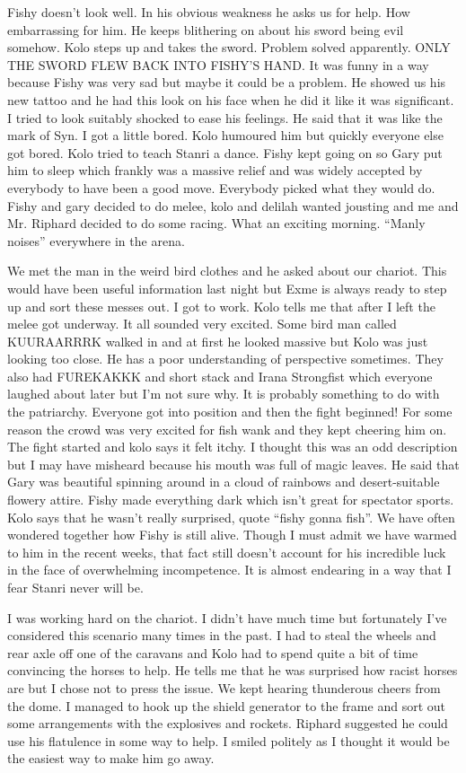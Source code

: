 Fishy doesn’t look well. In his obvious weakness he asks us for help. How embarrassing for him. He keeps blithering on about his sword being evil somehow. Kolo steps up and takes the sword. Problem solved apparently. ONLY THE SWORD FLEW BACK INTO FISHY’S HAND. It was funny in a way because Fishy was very sad but maybe it could be a problem. He showed us his new tattoo and he had this look on his face when he did it like it was significant. I tried to look suitably shocked to ease his feelings. He said that it was like the mark of Syn. I got a little bored. Kolo humoured him but quickly everyone else got bored. Kolo tried to teach Stanri a dance. Fishy kept going on so Gary put him to sleep which frankly was a massive relief and was widely accepted by everybody to have been a good move. Everybody picked what they would do. Fishy and gary decided to do melee, kolo and delilah wanted jousting and me and Mr. Riphard decided to do some racing. What an exciting morning. “Manly noises” everywhere in the arena.\medskip

We met the man in the weird bird clothes and he asked about our chariot. This would have been useful information last night but Exme is always ready to step up and sort these messes out. I got to work. Kolo tells me that after I left the melee got underway. It all sounded very excited. Some bird man called KUURAARRRK walked in and at first he looked massive but Kolo was just looking too close. He has a poor understanding of perspective sometimes. They also had FUREKAKKK and short stack and Irana Strongfist which everyone laughed about later but I’m not sure why. It is probably something to do with the patriarchy. Everyone got into position and then the fight beginned! For some reason the crowd was very excited for fish wank and they kept cheering him on. The fight started and kolo says it felt itchy. I thought this was an odd description but I may have misheard because his mouth was full of magic leaves. He said that Gary was beautiful spinning around in a cloud of rainbows and desert-suitable flowery attire. Fishy made everything dark which isn’t great for spectator sports. Kolo says that he wasn’t really surprised, quote “fishy gonna fish”. We have often wondered together how Fishy is still alive. Though I must admit we have warmed to him in the recent weeks, that fact still doesn’t account for his incredible luck in the face of overwhelming incompetence. It is almost endearing in a way that I fear Stanri never will be.\medskip

I was working hard on the chariot. I didn’t have much time but fortunately I’ve considered this scenario many times in the past. I had to steal the wheels and rear axle off one of the caravans and Kolo had to spend quite a bit of time convincing the horses to help. He tells me that he was surprised how racist horses are but I chose not to press the issue. We kept hearing thunderous cheers from the dome. I managed to hook up the shield generator to the frame and sort out some arrangements with the explosives and rockets. Riphard suggested he could use his flatulence in some way to help. I smiled politely as I thought it would be the easiest way to make him go away.\medskip

